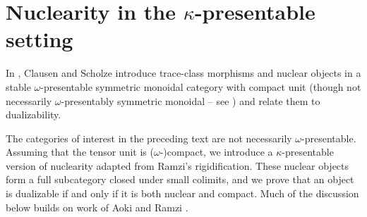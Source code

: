 \section{Nuclearity in the \texorpdfstring{$\kappa$}{kappa}-presentable setting}\label{app: nuclearity}
In \cite[Lecture VIII]{Complex}, Clausen and Scholze introduce trace-class morphisms and nuclear objects in a stable $\omega$-presentable symmetric monoidal category with compact unit (though not necessarily $\omega$-presentably symmetric monoidal -- see ) and relate them to dualizability. 

The categories of interest in the preceding text are not necessarily $\omega$-presentable. Assuming that the tensor unit is ($\omega$-)compact, we introduce a $\kappa$-presentable version of nuclearity adapted from Ramzi's rigidification. These nuclear objects form a full subcategory closed under small colimits, and we prove that an object is dualizable if and only if it is both nuclear and compact. Much of the discussion below builds on work of Aoki \cite{AokiSchwartz} and Ramzi \cite{RamziLocRigid,RamziDualizable}.
